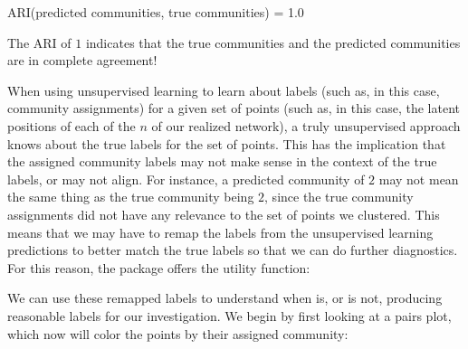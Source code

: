 \documentclass[letterpaper,10pt,english]{jupyterBook}
\begin{document}
\begin{sphinxVerbatim}[commandchars=\\\{\}]
ARI(predicted communities, true communities) = 1.0
\end{sphinxVerbatim}

\sphinxAtStartPar
The ARI of \(1\) indicates that the true communities and the predicted communities are in complete agreement!

\sphinxAtStartPar
When using unsupervised learning to learn about labels (such as, in this case, community assignments) for a given set of points (such as, in this case, the latent positions of each of the \(n\)  of our realized network), a truly unsupervised approach knows  about the true labels for the set of points. This has the implication that the assigned community labels may not make sense in the context of the true labels, or may not align. For instance, a predicted community of \(2\) may not mean the same thing as the true community being \(2\), since the true community assignments did not have any  relevance to the set of points we clustered. This means that we may have to remap the labels from the unsupervised learning predictions to better match the true labels so that we can do further diagnostics. For this reason, the  package offers the  utility function:

\begin{sphinxVerbatim}[commandchars=\\\{\}]
   

   
\end{sphinxVerbatim}

\sphinxAtStartPar
We can use these remapped labels to understand when  is, or is not, producing reasonable labels for our investigation. We begin by first looking at a pairs plot, which now will color the points by their assigned community:

\begin{sphinxVerbatim}[commandchars=\\\{\}]
         \PYG{p}{[}\PYG{p}{]}
\end{sphinxVerbatim}
\end{document}
